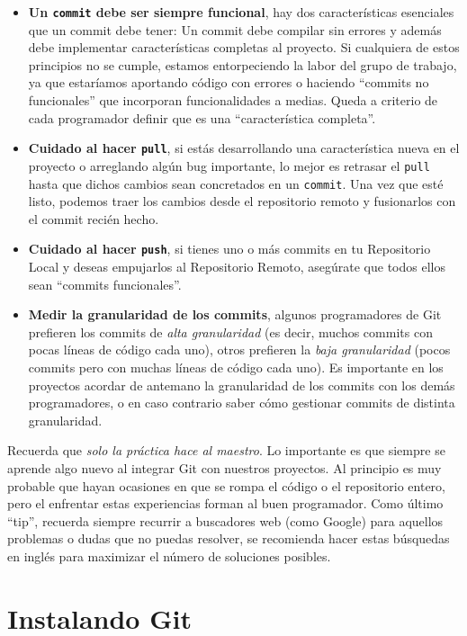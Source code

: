 \documentclass{article}
\begin{document}
\begin{itemize}
\item \textbf{Un \texttt{commit} debe ser siempre funcional}, hay dos características esenciales que un commit debe tener: Un commit debe compilar sin errores y además debe implementar características completas al proyecto. Si cualquiera de estos principios no se cumple, estamos entorpeciendo la labor del grupo de trabajo, ya que estaríamos aportando código con errores o haciendo ``commits no funcionales'' que incorporan funcionalidades a medias. Queda a criterio de cada programador definir que es una ``característica completa''.
\item \textbf{Cuidado al hacer \texttt{pull}}, si estás desarrollando una característica nueva en el proyecto o arreglando algún bug importante, lo mejor es retrasar el \texttt{pull} hasta que dichos cambios sean concretados en un \texttt{commit}. Una vez que esté listo, podemos traer los cambios desde el repositorio remoto y fusionarlos con el commit recién hecho.
\item \textbf{Cuidado al hacer \texttt{push}}, si tienes uno o más commits en tu Repositorio Local y deseas empujarlos al Repositorio Remoto, asegúrate que todos ellos sean ``commits funcionales''.
\item \textbf{Medir la granularidad de los commits}, algunos programadores de Git prefieren los commits de \textit{alta granularidad} (es decir, muchos commits con pocas líneas de código cada uno), otros prefieren la \textit{baja granularidad} (pocos commits pero con muchas líneas de código cada uno). Es importante en los proyectos acordar de antemano la granularidad de los commits con los demás programadores, o en caso contrario saber cómo gestionar commits de distinta granularidad.
\end{itemize}

Recuerda que \textit{solo la práctica hace al maestro}. Lo importante es que siempre se aprende algo nuevo al integrar Git con nuestros proyectos. Al principio es muy probable que hayan ocasiones en que se rompa el código o el repositorio entero, pero el enfrentar estas experiencias forman al buen programador. Como último ``tip'', recuerda siempre recurrir a buscadores web (como Google) para aquellos problemas o dudas que no puedas resolver, se recomienda hacer estas búsquedas en inglés para maximizar el número de soluciones posibles.

\pagebreak

\section{Instalando Git}\label{install}
\end{document}
